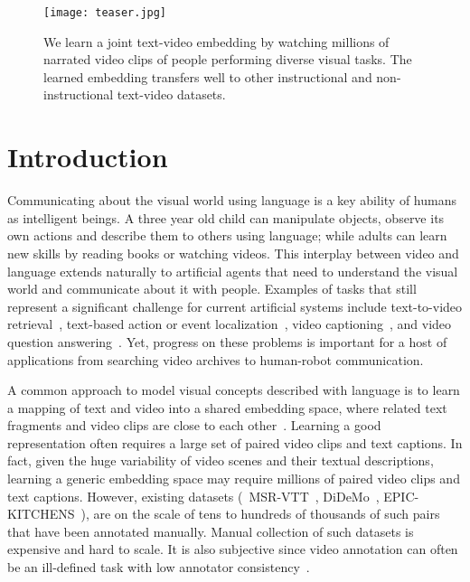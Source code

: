 \documentclass[10pt,twocolumn,letterpaper]{article}
\begin{document}
\begin{figure}[t]
\centering
\texttt{[image: teaser.jpg]}
\vspace{-6mm}
\caption{\small We learn a joint text-video embedding by watching millions of narrated video clips of people performing diverse visual tasks.  The learned embedding transfers well to other instructional and non-instructional text-video datasets.}
\vspace{-4mm}
\label{fig:teaser}
\end{figure}

\section{Introduction}
\label{section:intro}




Communicating about the visual world using language is a key ability of humans as intelligent beings.
A three year old child can manipulate objects, observe its own actions and describe them to others using language;
while adults can learn new skills by reading books or watching videos.
This interplay between video and language extends naturally to artificial agents that need to understand the visual world and communicate about it with people.
Examples of tasks that still represent a significant challenge for current artificial systems include text-to-video retrieval~\cite{klein15associating,miech18learning,wang2018learning,wang2016learning,yu18joint}, text-based action or event localization~\cite{hendricks17localizing}, video captioning~\cite{pan16hierarchical,yu2016video}, and video question answering~\cite{tapaswi16movieqa,yu18joint}.
Yet, progress on these problems is important for a host of applications from searching video archives to human-robot communication.

A common approach to model visual concepts
described with language is to learn a mapping of text and video into a shared embedding space, where related text fragments and video clips are close to each other~\cite{hendricks17localizing,miech18learning,pan16jointly,plummer2017enhancing,xu2015jointly}.
Learning a good representation often requires a large set of paired video clips and text captions.
In fact, given the huge variability of video scenes and their textual descriptions, learning a generic embedding space may require millions of paired video clips and text captions.
However, existing datasets (\eg~MSR-VTT~\cite{xu16msrvtt}, DiDeMo~\cite{hendricks17localizing}, EPIC-KITCHENS~\cite{damen2018scaling}), are on the scale of tens to hundreds of thousands of such pairs that have been annotated manually.
Manual collection of such datasets is expensive and hard to scale. It is also subjective since video annotation can often be an ill-defined task with low annotator consistency~\cite{xu16msrvtt}.
\end{document}
